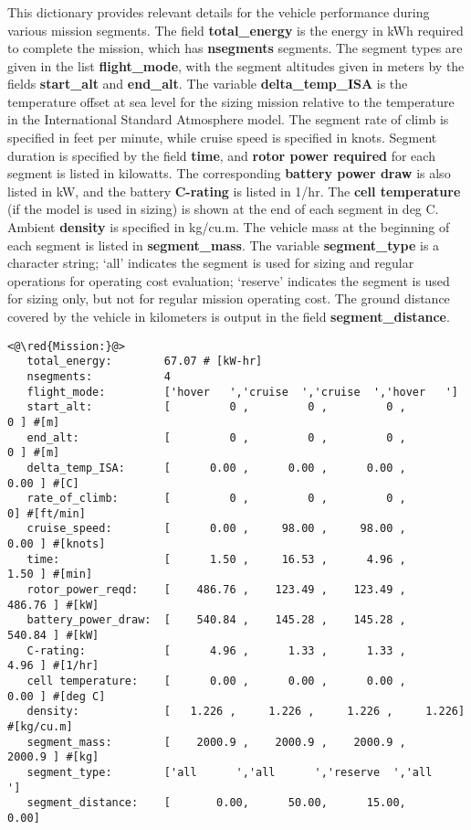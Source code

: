 \subsubsection{}
This dictionary provides relevant details for the vehicle performance during various mission segments. The field \textbf{total\_energy} is the energy in kWh required to complete the mission, which has \textbf{nsegments} segments. The segment types are given in the list \textbf{flight\_mode}, with the segment altitudes given in meters by the fields \textbf{start\_alt} and \textbf{end\_alt}. The variable \textbf{delta\_temp\_ISA} is the temperature offset at sea level for the sizing mission relative to the temperature in the International Standard Atmosphere model. The segment rate of climb is specified in feet per minute, while cruise speed is specified in knots. Segment duration is specified by the field \textbf{time}, and \textbf{rotor power required} for each segment is listed in kilowatts. The corresponding \textbf{battery power draw} is also listed in kW, and the battery \textbf{C-rating} is listed in 1/hr. The \textbf{cell temperature} (if the model is used in sizing) is shown at the end of each segment in deg C. Ambient \textbf{density} is specified in kg/cu.m. The vehicle mass at the beginning of each segment is listed in \textbf{segment\_mass}. The variable \textbf{segment\_type} is a character string; `all' indicates the segment is used for sizing and regular operations for operating cost evaluation; `reserve' indicates the segment is used for sizing only, but not for regular mission operating cost. The ground distance covered by the vehicle in kilometers is output in the field \textbf{segment\_distance}.
\begin{lstlisting}
<@\red{Mission:}@>
   total_energy:        67.07 # [kW-hr]
   nsegments:           4 
   flight_mode:         ['hover   ','cruise  ','cruise  ','hover   '] 
   start_alt:           [         0 ,         0 ,         0 ,         0 ] #[m]
   end_alt:             [         0 ,         0 ,         0 ,         0 ] #[m]
   delta_temp_ISA:      [      0.00 ,      0.00 ,      0.00 ,      0.00 ] #[C]
   rate_of_climb:       [         0 ,         0 ,         0 ,         0] #[ft/min]
   cruise_speed:        [      0.00 ,     98.00 ,     98.00 ,      0.00 ] #[knots]
   time:                [      1.50 ,     16.53 ,      4.96 ,      1.50 ] #[min]
   rotor_power_reqd:    [    486.76 ,    123.49 ,    123.49 ,    486.76 ] #[kW]
   battery_power_draw:  [    540.84 ,    145.28 ,    145.28 ,    540.84 ] #[kW]
   C-rating:            [      4.96 ,      1.33 ,      1.33 ,      4.96 ] #[1/hr]
   cell temperature:    [      0.00 ,      0.00 ,      0.00 ,      0.00 ] #[deg C]
   density:             [   1.226 ,     1.226 ,     1.226 ,     1.226] #[kg/cu.m]
   segment_mass:        [    2000.9 ,    2000.9 ,    2000.9 ,    2000.9 ] #[kg]
   segment_type:        ['all      ','all      ','reserve  ','all      ']
   segment_distance:    [       0.00,      50.00,      15.00,       0.00]
\end{lstlisting}


